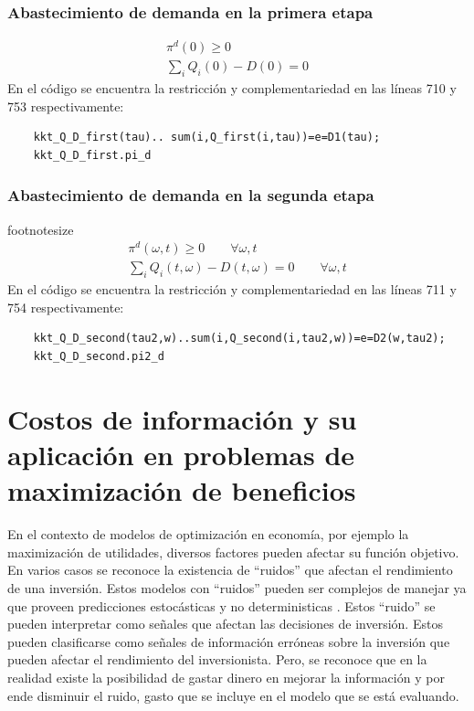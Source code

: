 \subsubsection{Abastecimiento de demanda en la primera etapa}
\footnotesize{
\begin{align}
 \pi^d(0) \geq 0 \\
 \sum_{i}Q_i(0) - D(0) = 0   
\end{align}}
En el código se encuentra la restricción y complementariedad en las líneas 710 y 753 respectivamente: 
\begin{verbatim}
    kkt_Q_D_first(tau).. sum(i,Q_first(i,tau))=e=D1(tau);
    kkt_Q_D_first.pi_d
\end{verbatim}

\subsubsection{Abastecimiento de demanda en la segunda etapa}
footnotesize{
\begin{align}
 \pi^d(\omega,t) \geq 0 \qquad \forall \omega,t\\
 \sum_{i}Q_i(t,\omega) - D(t,\omega) = 0 \qquad \forall \omega,t  
\end{align}}
En el código se encuentra la restricción y complementariedad en las líneas 711 y 754 respectivamente: 
\begin{verbatim}
    kkt_Q_D_second(tau2,w)..sum(i,Q_second(i,tau2,w))=e=D2(w,tau2);
    kkt_Q_D_second.pi2_d
\end{verbatim}


\section{Costos de información y su aplicación en problemas de maximización de beneficios}\label{marco:costos}

En el contexto de modelos de optimización en economía, por ejemplo la maximización de utilidades, diversos factores pueden afectar su función objetivo. En varios casos se reconoce la existencia de ``ruidos'' que afectan el rendimiento de una inversión. Estos modelos con ``ruidos'' pueden ser complejos de manejar ya que proveen predicciones estocásticas y no deterministicas . Estos ``ruido'' se pueden interpretar como señales que afectan las decisiones de inversión. Estos pueden clasificarse como señales de información erróneas sobre la inversión que pueden afectar el rendimiento del inversionista. Pero, se reconoce que en la realidad existe la posibilidad de gastar dinero en mejorar la información y por ende disminuir el ruido, gasto que se incluye en el modelo que se está evaluando.
\vspace{2.5mm}

